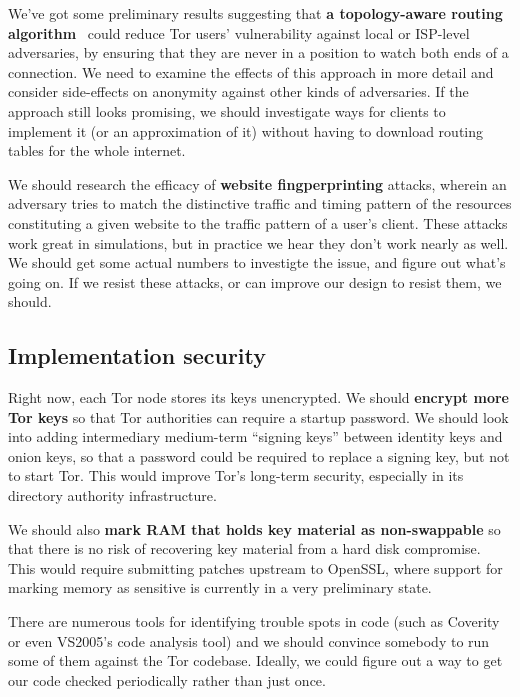 \documentclass{article}
\newcommand{\tmp}[1]{{\bf #1} [......] \\}
\begin{document}
We've got some preliminary results suggesting that {\bf a topology-aware
  routing algorithm}~\cite{routing-zones} could reduce Tor users'
vulnerability against local or ISP-level adversaries, by ensuring that they
are never in a position to watch both ends of a connection.  We need to
examine the effects of this approach in more detail and consider side-effects
on anonymity against other kinds of adversaries.  If the approach still looks
promising, we should investigate ways for clients to implement it (or an
approximation of it) without having to download routing tables for the whole
internet.

%

We should research the efficacy of {\bf website fingperprinting} attacks,
wherein an adversary tries to match the distinctive traffic and timing
pattern of the resources constituting a given website to the traffic pattern
of a user's client.  These attacks work great in simulations, but in
practice we hear they don't work nearly as well.  We should get some actual
numbers to investigte the issue, and figure out what's going on.  If we
resist these attacks, or can improve our design to resist them, we should.

\subsection{Implementation security}
Right now, each Tor node stores its keys unencrypted.  We should {\bf encrypt
  more Tor keys} so that Tor authorities can require a startup password.  We
should look into adding intermediary medium-term ``signing keys'' between
identity keys and onion keys, so that a password could be required to replace
a signing key, but not to start Tor.  This would improve Tor's long-term
security, especially in its directory authority infrastructure.

We should also {\bf mark RAM that holds key material as non-swappable} so
that there is no risk of recovering key material from a hard disk
compromise.  This would require submitting patches upstream to OpenSSL, where
support for marking memory as sensitive is currently in a very preliminary
state.

There are numerous tools for identifying trouble spots in code (such as
Coverity or even VS2005's code analysis tool) and we should convince somebody
to run some of them against the Tor codebase.  Ideally, we could figure out a
way to get our code checked periodically rather than just once.
\end{document}
